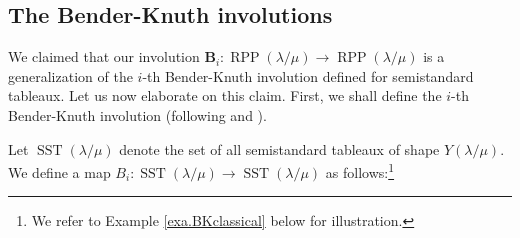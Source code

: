 \documentclass[numbers=enddot,12pt,final,onecolumn,notitlepage]{scrartcl}%
\theoremstyle{definition}
\begin{document}
\subsection{The Bender-Knuth involutions}

We claimed that our involution $\mathbf{B}_{i}:\operatorname*{RPP}\left(
\lambda/\mu\right)  \rightarrow\operatorname*{RPP}\left(  \lambda/\mu\right)
$ is a generalization of the $i$-th Bender-Knuth involution defined for
semistandard tableaux. Let us now elaborate on this claim. First, we shall
define the $i$-th Bender-Knuth involution (following \cite[proof of
Proposition 2.11]{GriRei15} and \cite[proof of Theorem 7.10.2]{Stan99}).

Let $\operatorname*{SST}\left(  \lambda/\mu\right)  $ denote the set of all
semistandard tableaux of shape $Y\left(  \lambda/\mu\right)  $. We define a
map $B_{i}:\operatorname*{SST}\left(  \lambda/\mu\right)  \rightarrow
\operatorname*{SST}\left(  \lambda/\mu\right)  $ as follows:\footnote{We refer
to Example \ref{exa.BKclassical} below for illustration.}
\end{document}
